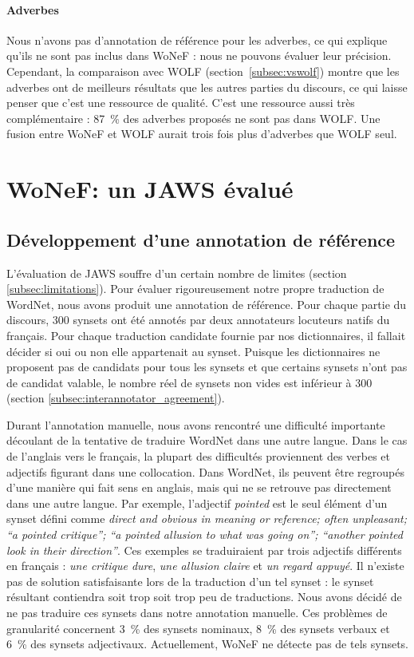 \paragraph{Adverbes}

Nous n'avons pas d'annotation de référence pour les adverbes, ce qui explique qu'ils ne sont pas inclus dans WoNeF : nous ne pouvons évaluer leur précision. Cependant, la comparaison avec WOLF (section~\ref{subsec:vswolf}) montre que les adverbes ont de meilleurs résultats que les autres parties du discours, ce qui laisse penser que c'est une ressource de qualité. C'est une ressource aussi très complémentaire : 87~\% des adverbes proposés ne sont pas dans WOLF. Une fusion entre WoNeF et WOLF aurait trois fois plus d'adverbes que WOLF seul.

\section{WoNeF: un JAWS évalué}
\label{sec:evaluating_jaws}

\subsection{Développement d'une annotation de référence}
\label{subsec:gold_standard}

L'évaluation de JAWS souffre d'un certain nombre de limites (section \ref{subsec:limitations}). Pour évaluer rigoureusement notre propre traduction de WordNet, nous avons produit une annotation de référence. Pour chaque partie du discours, 300 synsets ont été annotés par deux annotateurs locuteurs natifs du français. Pour chaque traduction candidate fournie par nos dictionnaires, il fallait décider si oui ou non elle appartenait au synset. Puisque les dictionnaires ne proposent pas de candidats pour tous les synsets et que certains synsets n'ont pas de candidat valable, le nombre réel de synsets non vides est inférieur à 300 (section \ref{subsec:interannotator_agreement}).

Durant l'annotation manuelle, nous avons rencontré une difficulté importante découlant de la tentative de traduire WordNet dans une autre langue. Dans le cas de l'anglais vers le français, la plupart des difficultés proviennent des verbes et adjectifs figurant dans une collocation. Dans WordNet, ils peuvent être regroupés d'une manière qui fait sens en anglais, mais qui ne se retrouve pas directement dans une autre langue. Par exemple, l'adjectif \textit{pointed} est le seul élément d'un synset défini comme \textit{direct and obvious in meaning or reference; often unpleasant; ``a pointed critique''; ``a pointed allusion to what was going on''; ``another pointed look in their direction''}. Ces exemples se traduiraient par trois adjectifs différents en français : \textit{une critique dure}, \textit{une allusion claire} et \textit{un regard appuyé}. Il n'existe pas de solution satisfaisante lors de la traduction d'un tel synset : le synset résultant contiendra soit trop soit trop peu de traductions. Nous avons décidé de ne pas traduire ces synsets dans notre annotation manuelle. Ces problèmes de granularité concernent 3~\% des synsets nominaux, 8~\% des synsets verbaux et 6~\% des synsets adjectivaux. Actuellement, WoNeF ne détecte pas de tels synsets.

